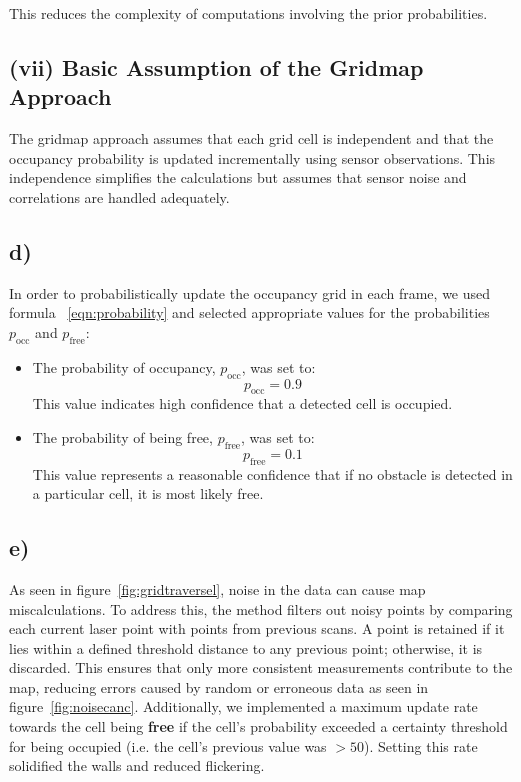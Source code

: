\documentclass[template,12pt,a4paper,enabledeprecatedfontcommands]{template}
\begin{document}
\noindent This reduces the complexity of computations involving the prior probabilities.

\subsection*{(vii) Basic Assumption of the Gridmap Approach}
The gridmap approach assumes that each grid cell is independent and that the occupancy probability is updated incrementally using sensor observations. This independence simplifies the calculations but assumes that sensor noise and correlations are handled adequately.


\subsection{d)}

\noindent In order to probabilistically update the occupancy grid in each frame, we used formula ~\ref{eqn:probability} and selected appropriate values for the probabilities \( p_{\text{occ}} \) and \( p_{\text{free}} \):

\begin{itemize}
    \item The probability of occupancy, \( p_{\text{occ}} \), was set to:
    \[
    p_{\text{occ}} = 0.9
    \]
    This value indicates high confidence that a detected cell is occupied.

    \item The probability of being free, \( p_{\text{free}} \), was set to:
    \[
    p_{\text{free}} = 0.1
    \]
    This value represents a reasonable confidence that if no obstacle is detected in a particular cell, it is most likely free.
\end{itemize}


\subsection{e)}
As seen in figure~\ref{fig:gridtraversel}, noise in the data can cause map miscalculations. To address this, the method filters out noisy points by comparing each current laser point with points from previous scans. A point is retained if it lies within a defined threshold distance to any previous point; otherwise, it is discarded. This ensures that only more consistent measurements contribute to the map, reducing errors caused by random or erroneous data as seen in figure~\ref{fig:noisecanc}. Additionally, we implemented a maximum update rate towards the cell being \textbf{free} if the cell's probability exceeded a certainty threshold for being occupied (i.e. the cell's previous value was $> 50$). Setting this rate solidified the walls and reduced flickering.
\end{document}
